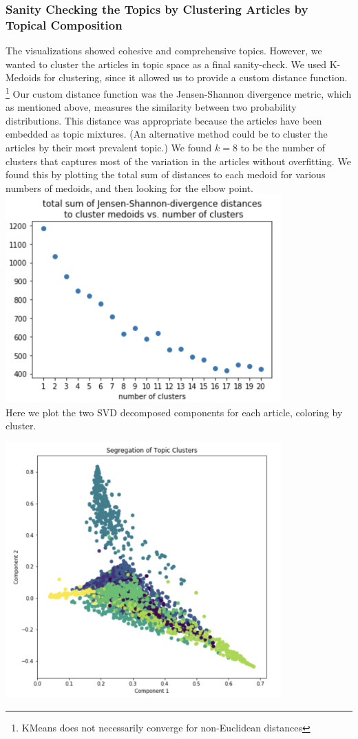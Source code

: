 \documentclass[11pt]{article}
\begin{document}
\subsubsection{Sanity Checking the Topics by Clustering Articles by Topical Composition}
The visualizations showed cohesive and comprehensive topics. However, we wanted to cluster the articles in topic space as a final sanity-check.  We used K-Medoids for clustering, since it allowed us to provide a custom distance function. \footnote{KMeans does not necessarily converge for non-Euclidean distances}  Our custom distance function was the Jensen-Shannon divergence metric, which as mentioned above, measures the similarity between two probability distributions.  This distance was appropriate because the articles have been embedded as topic mixtures.  (An alternative method could be to cluster the articles by their most prevalent topic.)  We found $k=8$ to be the number of clusters that captures most of the variation in the articles without overfitting. We found this by plotting the total sum of distances to each medoid for various numbers of medoids, and then looking for the elbow point.  \\

\includegraphics[width=300pt]{jensen.png} \\

Here we plot the two SVD decomposed components for each article, coloring by cluster.

\includegraphics[width=300pt]{svd_clusters.png} \\
\end{document}
